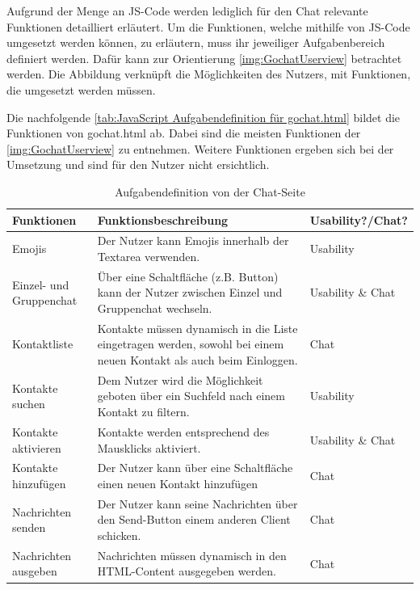 \documentclass[a4paper,titlepage,halfparskip,12pt]{scrreprt}
\begin{document}
\begin{onehalfspacing}
Aufgrund der Menge an \ac{JS}-Code werden lediglich für den Chat relevante Funktionen detailliert erläutert. Um die Funktionen, welche mithilfe von JS-Code umgesetzt werden können, zu erläutern, muss ihr jeweiliger Aufgabenbereich definiert werden. Dafür kann zur Orientierung \autoref{img:GochatUserview} betrachtet werden. Die Abbildung verknüpft die Möglichkeiten des Nutzers, mit Funktionen, die umgesetzt werden müssen.

\pagebreak

Die nachfolgende \autoref{tab:JavaScript Aufgabendefinition für gochat.html} bildet die Funktionen von gochat.html ab. Dabei sind die meisten Funktionen der \autoref{img:GochatUserview} zu entnehmen. Weitere Funktionen ergeben sich bei der Umsetzung und sind für den Nutzer nicht ersichtlich.
\begin{table}[h]
	\centering
	\caption{Aufgabendefinition von der Chat-Seite}
	\begin{tabular}{|p{2.5cm}|p{8.8cm}|p{3.5cm}|}
		\hline
		\textbf{Funktionen} & \textbf{Funktionsbeschreibung} & \textbf{Usability?/Chat?}  \\
		\hline
		Emojis & Der Nutzer kann Emojis innerhalb der Textarea verwenden. & Usability \\
		\hline
		Einzel- und Gruppenchat & Über eine Schaltfläche (z.B. Button) kann der Nutzer zwischen Einzel und Gruppenchat wechseln. & Usability \linebreak \& Chat\\
		\hline
		Kontaktliste & Kontakte müssen dynamisch in die Liste eingetragen werden, sowohl bei einem neuen Kontakt als auch beim Einloggen. & Chat\\
		\hline
		Kontakte \linebreak suchen & Dem Nutzer wird die Möglichkeit geboten über ein Suchfeld nach einem Kontakt zu filtern. & Usability\\
		\hline
		Kontakte \linebreak aktivieren & Kontakte werden entsprechend des Mausklicks aktiviert. & Usability \linebreak \& Chat\\
		\hline
		Kontakte \linebreak hinzufügen & Der Nutzer kann über eine Schaltfläche einen neuen Kontakt hinzufügen & Chat\\
		\hline
		Nachrichten senden & Der Nutzer kann seine Nachrichten über den Send-Button einem anderen Client schicken. & Chat\\
		\hline
		Nachrichten ausgeben & Nachrichten müssen dynamisch in den \ac{HTML}-Content ausgegeben werden. & Chat\\

\end{tabular}
\end{table}
\end{onehalfspacing}
\end{document}
